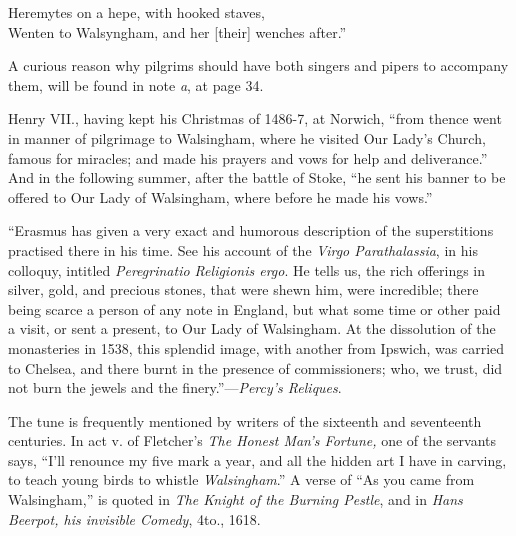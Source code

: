 \settowidth{\versewidth}{Wenten to Walsyngham, and her [their] wenches after.}
\begin{scverse}
Heremytes on a hepe, with hooked staves,\\
Wenten to Walsyngham, and her [their] wenches after.”
\end{scverse}

A curious reason why pilgrims should have both singers and pipers to accompany
them, will be found in note \textit{a}, at page 34.

Henry VII., having kept his Christmas of 1486-7, at Norwich, “from thence
went in manner of pilgrimage to Walsingham, where he visited Our Lady’s Church, 
famous for miracles;  and made his prayers \pagebreak and vows for help and deliverance.”
And in the following summer, after the battle of Stoke, “he sent his banner to
be offered to Our Lady of Walsingham, where before he made his vows.”

“Erasmus has given a very exact and humorous description of the superstitions
practised there in his time. See his account of the \textit{Virgo Parathalassia}, in his
colloquy, intitled \textit{Peregrinatio Religionis ergo}. He tells us, the rich offerings in
silver, gold, and precious stones, that were shewn him, were incredible; there being
scarce a person of any note in England, but what some time or other paid a visit,
or sent a present, to Our Lady of Walsingham. At the dissolution of the monasteries
in 1538, this splendid image, with another from Ipswich, was carried to
Chelsea, and there burnt in the presence of commissioners; who, we trust, did not
burn the jewels and the finery.”—\textit{Percy’s Reliques}.

The tune is frequently mentioned by writers of the sixteenth and seventeenth
centuries. In act v. of Fletcher’s \textit{The Honest Man’s Fortune,} one of the servants
says, “I’ll renounce my five mark a year, and all the hidden art I have in carving,
to teach young birds to whistle \textit{Walsingham}.” A verse of “As you came from
Walsingham,” is quoted in \textit{The Knight of the Burning Pestle}, and in \textit{Hans Beerpot,
his invisible Comedy}, 4to., 1618.

